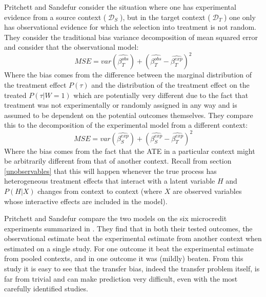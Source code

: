 \documentclass[a4paper,12pt]{article}
\DeclareMathOperator*{\D}{\mathcal{D}}
\begin{document}
Pritchett and Sandefur \parencite*{Pritchett2016} consider the situation where one has experimental evidence from a source context ($\D_S$), but in the target context ($\D_T$) one only has observational evidence for which the selection into treatment is not random. They consider the traditional bias variance decomposition of mean squared error and consider that the observational model:
%
$$
MSE = var(\hat{\beta^{obs}_T}) + (\hat{\beta^{obs}_T} - \hat{\beta^{exp}_T})^2
$$
%
Where the bias comes from the difference between the marginal distribution of the treatment effect $P(\tau)$ and the distribution of the treatment effect on the treated $P(\tau | W = 1)$ which are potentially very different due to the fact that treatment was not experimentally or randomly assigned in any way and is assumed to be dependent on the potential outcomes themselves. They compare this to the decomposition of the experimental model from a different context: 
%
$$
MSE = var(\hat{\beta^{exp}_S}) + (\hat{\beta^{exp}_S} - \hat{\beta^{exp}_T})^2
$$
%
Where the bias comes from the fact that the ATE in a particular context might be arbitrarily different from that of another context. Recall from section \ref{unobservables} that this will happen whenever the true process has heterogeneous treatment effects that interact with a latent variable $H$ and $P(H | X)$ changes from context to context (where $X$ are observed variables whose interactive effects are included in the model). 

Pritchett and Sandefur compare the two models on the six microcredit experiments summarized in \cite{Banerjee2015a}. They find that in both their tested outcomes, the observational estimate beat the experimental estimate from another context when estimated on a single study. For one outcome it beat the experimental estimate from pooled contexts, and in one outcome it was (mildly) beaten. From this study it is easy to see that the transfer bias, indeed the transfer problem itself, is far from trivial and can make prediction very difficult, even with the most carefully identified studies. 
\end{document}
